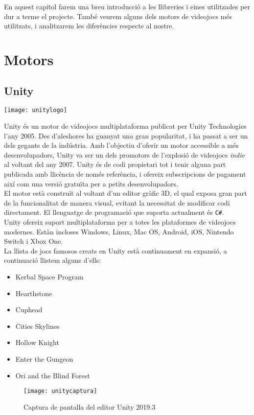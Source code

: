 En aquest capítol farem una breu introducció a les llibreries i eines utilitzades per dur a terme el projecte. També veurem alguns dels motors de videojocs més utilitzats, i analitzarem les diferències respecte al nostre.
\section{Motors}
\subsection{Unity}
\begin{center}
\texttt{[image: unitylogo]}
\end{center}
Unity és un motor de videojocs multiplataforma publicat per Unity Technologies l'any 2005. Des d'aleshores ha guanyat una gran popularitat, i ha passat a ser un dels gegants de la indústria.
Amb l'objectiu d'oferir un motor accessible a més desenvolupadors, Unity va ser un dels promotors de l'explosió de videojocs \textit{indie} al voltant del any 2007.
Unity és de codi propietari tot i tenir alguna part publicada amb llicència de només referència, i ofereix subscripcions de pagament així com una versió gratuïta per a petits desenvolupadors.
\\
El motor està construït al voltant d'un editor gràfic 3D, el qual exposa gran part de la funcionalitat de manera visual, evitant la necessitat de modificar codi directament.
El llenguatge de programació que suporta actualment és \texttt{C\#}.
\\
Unity ofereix suport multiplataforma per a totes les plataformes de videojocs modernes. Estàn incloses Windows, Linux, Mac OS, Android, iOS, Nintendo Switch i Xbox One.
\\
La llista de jocs famosos creats en Unity està continuament en expansió, a continuació llistem alguns d'ells:
\begin{itemize}
  \item Kerbal Space Program
  \item Hearthstone
  \item Cuphead
  \item Cities Skylines
  \item Hollow Knight
  \item Enter the Gungeon
  \item Ori and the Blind Forest
\end{itemize}

\begin{figure}[h]
  \texttt{[image: unitycaptura]}
  \caption{Captura de pantalla del editor Unity 2019.3}
\end{figure}

